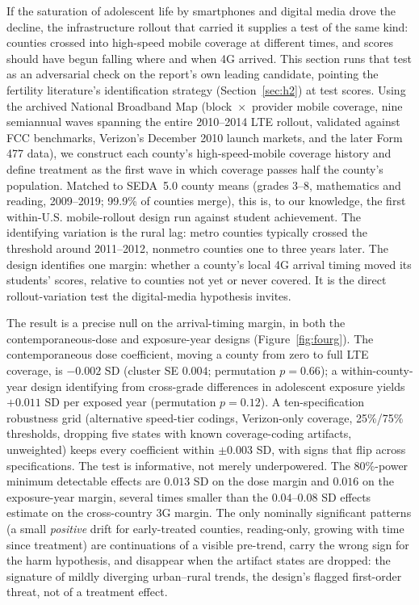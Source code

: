 \documentclass[11pt]{article}
\begin{document}
If the saturation of adolescent life by smartphones and digital media drove the decline, the infrastructure rollout that carried it supplies a test of the same kind: counties crossed into high-speed mobile coverage at different times, and scores should have begun falling where and when 4G arrived. This section runs that test as an adversarial check on the report's own leading candidate, pointing the fertility literature's identification strategy (Section~\ref{sec:h2}) at test scores. Using the archived National Broadband Map (block~$\times$~provider mobile coverage, nine semiannual waves spanning the entire 2010--2014 LTE rollout, validated against FCC benchmarks, Verizon's December 2010 launch markets, and the later Form 477 data), we construct each county's high-speed-mobile coverage history and define treatment as the first wave in which coverage passes half the county's population. Matched to SEDA~5.0 county means (grades 3--8, mathematics and reading, 2009--2019; 99.9\% of counties merge), this is, to our knowledge, the first within-U.S. mobile-rollout design run against student achievement. The identifying variation is the rural lag: metro counties typically crossed the threshold around 2011--2012, nonmetro counties one to three years later. The design identifies one margin: whether a county's local 4G arrival timing moved its students' scores, relative to counties not yet or never covered. It is the direct rollout-variation test the digital-media hypothesis invites.

The result is a precise null on the arrival-timing margin, in both the contemporaneous-dose and exposure-year designs (Figure~\ref{fig:fourg}). The contemporaneous dose coefficient, moving a county from zero to full LTE coverage, is $-0.002$ SD (cluster SE $0.004$; permutation $p=0.66$); a within-county-year design identifying from cross-grade differences in adolescent exposure yields $+0.011$ SD per exposed year (permutation $p=0.12$). A ten-specification robustness grid (alternative speed-tier codings, Verizon-only coverage, 25\%/75\% thresholds, dropping five states with known coverage-coding artifacts, unweighted) keeps every coefficient within $\pm0.003$ SD, with signs that flip across specifications. The test is informative, not merely underpowered. The 80\%-power minimum detectable effects are $0.013$ SD on the dose margin and $0.016$ on the exposure-year margin, several times smaller than the $0.04$--$0.08$ SD effects \citet{jainstemper2024} estimate on the cross-country 3G margin. The only nominally significant patterns (a small \emph{positive} drift for early-treated counties, reading-only, growing with time since treatment) are continuations of a visible pre-trend, carry the wrong sign for the harm hypothesis, and disappear when the artifact states are dropped: the signature of mildly diverging urban--rural trends, the design's flagged first-order threat, not of a treatment effect.
\end{document}
